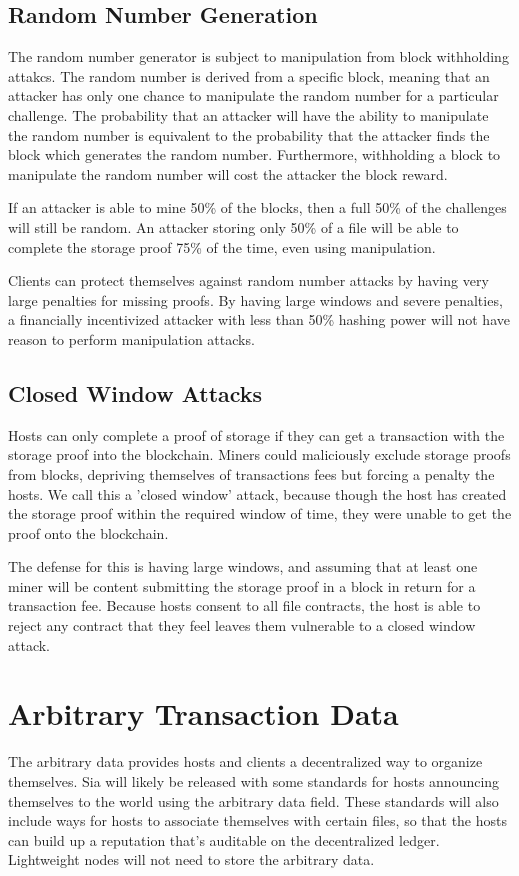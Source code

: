 \documentclass[twocolumn]{article}
\begin{document}
\subsection{Random Number Generation}
The random number generator is subject to manipulation from block withholding attakcs.
The random number is derived from a specific block, meaning that an attacker has only one chance to manipulate the random number for a particular challenge.
The probability that an attacker will have the ability to manipulate the random number is equivalent to the probability that the attacker finds the block which generates the random number.
Furthermore, withholding a block to manipulate the random number will cost the attacker the block reward.

If an attacker is able to mine 50\% of the blocks, then a full 50\% of the challenges will still be random.
An attacker storing only 50\% of a file will be able to complete the storage proof 75\% of the time, even using manipulation.

Clients can protect themselves against random number attacks by having very large penalties for missing proofs.
By having large windows and severe penalties, a financially incentivized attacker with less than 50\% hashing power will not have reason to perform manipulation attacks.

\subsection{Closed Window Attacks}
Hosts can only complete a proof of storage if they can get a transaction with the storage proof into the blockchain.
Miners could maliciously exclude storage proofs from blocks, depriving themselves of transactions fees but forcing a penalty the hosts.
We call this a 'closed window' attack, because though the host has created the storage proof within the required window of time, they were unable to get the proof onto the blockchain.

The defense for this is having large windows, and assuming that at least one miner will be content submitting the storage proof in a block in return for a transaction fee.
Because hosts consent to all file contracts, the host is able to reject any contract that they feel leaves them vulnerable to a closed window attack.

\section{Arbitrary Transaction Data}
The arbitrary data provides hosts and clients a decentralized way to organize themselves.
Sia will likely be released with some standards for hosts announcing themselves to the world using the arbitrary data field.
These standards will also include ways for hosts to associate themselves with certain files, so that the hosts can build up a reputation that's auditable on the decentralized ledger.
Lightweight nodes will not need to store the arbitrary data.
\end{document}
